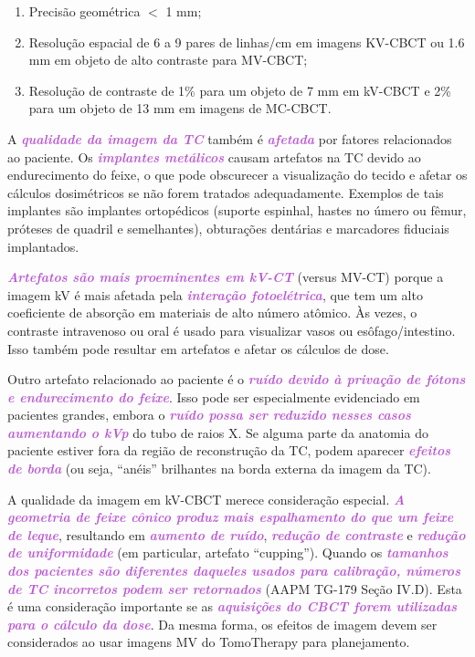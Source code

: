 \documentclass[11pt,a4paper]{article}
\begin{document}
    \begin{enumerate}[label=\textcolor{CarnationPink}{\roman*.}]
        \item Precisão geométrica $<$ 1 mm;
        \item Resolução espacial de 6 a 9 pares de linhas/cm em imagens KV-CBCT ou 1.6 mm em objeto de alto contraste para MV-CBCT;
        \item Resolução de contraste de 1\% para um objeto de 7 mm em kV-CBCT e 2\% para um objeto de 13 mm em imagens de MC-CBCT.
    \end{enumerate}

    A \textcolor{MediumOrchid}{\textbf{\textit{qualidade da imagem da TC}}} também é \textcolor{MediumOrchid}{\textbf{\textit{afetada}}} por fatores relacionados ao paciente. Os \textcolor{MediumOrchid}{\textbf{\textit{implantes metálicos}}} causam artefatos na TC devido ao endurecimento do feixe, o que pode obscurecer a visualização do tecido e afetar os cálculos dosimétricos se não forem tratados adequadamente. Exemplos de tais implantes são implantes ortopédicos (suporte espinhal, hastes no úmero ou fêmur, próteses de quadril e semelhantes), obturações dentárias e marcadores fiduciais implantados.

    \textcolor{MediumOrchid}{\textbf{\textit{Artefatos são mais proeminentes em kV-CT}}} (versus MV-CT) porque a imagem kV é mais afetada pela \textcolor{MediumOrchid}{\textbf{\textit{interação fotoelétrica}}}, que tem um alto coeficiente de absorção em materiais de alto número atômico. Às vezes, o contraste intravenoso ou oral é usado para visualizar vasos ou esôfago/intestino. Isso também pode resultar em artefatos e afetar os cálculos de dose. 
    
    Outro artefato relacionado ao paciente é o \textcolor{MediumOrchid}{\textbf{\textit{ruído devido à privação de fótons e endurecimento do feixe}}}. Isso pode ser especialmente evidenciado em pacientes grandes, embora o \textcolor{MediumOrchid}{\textbf{\textit{ruído possa ser reduzido nesses casos aumentando o kVp}}} do tubo de raios X. Se alguma parte da anatomia do paciente estiver fora da região de reconstrução da TC, podem aparecer \textcolor{MediumOrchid}{\textbf{\textit{efeitos de borda}}} (ou seja, “anéis” brilhantes na borda externa da imagem da TC).

    A qualidade da imagem em kV-CBCT merece consideração especial. \textcolor{MediumOrchid}{\textbf{\textit{A geometria de feixe cônico produz mais espalhamento do que um feixe de leque}}}, resultando em \textcolor{MediumOrchid}{\textbf{\textit{aumento de ruído}}}, \textcolor{MediumOrchid}{\textbf{\textit{redução de contraste}}} e \textcolor{MediumOrchid}{\textbf{\textit{redução de uniformidade}}} (em particular, artefato “cupping”). Quando os \textcolor{MediumOrchid}{\textbf{\textit{tamanhos dos pacientes são diferentes daqueles usados para calibração, números de TC incorretos podem ser retornados}}} (AAPM TG-179 Seção IV.D). Esta é uma consideração importante se as \textcolor{MediumOrchid}{\textbf{\textit{aquisições do CBCT forem utilizadas para o cálculo da dose}}}. Da mesma forma, os efeitos de imagem devem ser considerados ao usar imagens MV do TomoTherapy para planejamento.
\end{document}
